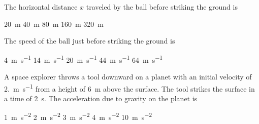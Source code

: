 \documentclass{../../../oss-classkick-exam}
\begin{document}
\genheader


\genmultidirections

\gengravity

\raggedcolumns
\begin{multicols*}{2}
  \begin{questions}
    
    \question The horizontal distance $x$ traveled by the ball before striking
    the ground is
    \begin{choices}
      \choice\SI{20}{\metre}
      \choice\SI{40}{\metre}
      \choice\SI{80}{\metre} 
      \choice\SI{160}{\metre}
      \choice\SI{320}{\metre}
    \end{choices}
    
    \question The speed of the ball just before striking the ground is
    \begin{choices}
      \choice\SI{4}{\metre\per\second}
      \choice\SI{14}{\metre\per\second}
      \choice\SI{20}{\metre\per\second}
      \choice\SI{44}{\metre\per\second}
      \choice\SI{64}{\metre\per\second}
    \end{choices}

    \question A space explorer throws a tool downward on a planet with an
    initial velocity of \SI{2.}{\metre\per\second} from a height of
    \SI{6}{\metre} above the surface. The tool strikes the surface in a time of
    \SI{2}{\second}. The acceleration due to gravity on the planet is
    \begin{choices}
      \choice\SI{1}{\metre\per\second\squared}
      \choice\SI{2}{\metre\per\second\squared}
      \choice\SI{3}{\metre\per\second\squared}
      \choice\SI{4}{\metre\per\second\squared}
      \choice\SI{10}{\metre\per\second\squared}
    \end{choices}


\end{questions}
\end{multicols*}
\end{document}
